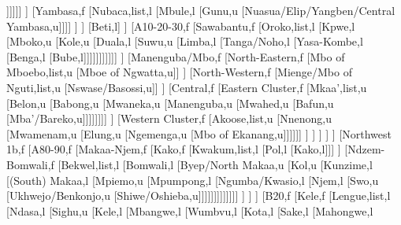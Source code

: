 \documentclass[landscape]{standalone}
\begin{document}
\begin{forest}
														[Tunen,l
														[Tuotomb,l
														[Yambeta,u
														[Nyokon,u]]]]]]
													]%
													[Yambasa,f
														[Nubaca,list,l
														[Mbule,l
														[Gunu,u
														[Nuasua/Elip/Yangben/Central Yambasa,u]]]]														
													]%
												]%
												[Beti,l]
											]%
											[A10-20-30,f
												[Sawabantu,f
													[Oroko,list,l
													[Kpwe,l
													[Mboko,u
													[Kole,u
													[Duala,l
													[Suwu,u
													[Limba,l
													[Tanga/Noho,l
													[Yasa-Kombe,l
													[Benga,l
													[Bube,l]]]]]]]]]]]
												]%
												[Manenguba/Mbo,f
													[North-Eastern,f
														[Mbo of Mboebo,list,u
														[Mboe of Ngwatta,u]]
													]%
													[North-Western,f
														[Mienge/Mbo of Nguti,list,u
														[Nswase/Basossi,u]]
													]%
													[Central,f
														[Eastern Cluster,f
															[Mkaa',list,u
															[Belon,u
															[Babong,u
															[Mwaneka,u
															[Manenguba,u
															[Mwahed,u
															[Bafun,u
															[Mba'/Bareko,u]]]]]]]]
														]%
														[Western Cluster,f
															[Akoose,list,u
															[Nnenong,u
															[Mwamenam,u
															[Elung,u
															[Ngemenga,u
															[Mbo of Ekanang,u]]]]]]
														]%
													]%
												]%
											]%
										]%
										[Northwest 1b,f
											[A80-90,f
												[Makaa-Njem,f
													[Kako,f
														[Kwakum,list,l
														[Pol,l
														[Kako,l]]]
													]%
													[Ndzem-Bomwali,f
														[Bekwel,list,l
														[Bomwali,l
														[Byep/North Makaa,u
														[Kol,u
														[Kunzime,l
														[(South) Makaa,l
														[Mpiemo,u
														[Mpumpong,l
														[Ngumba/Kwasio,l
														[Njem,l
														[Swo,u
														[Ukhwejo/Benkonjo,u
														[Shiwe/Oshieba,u]]]]]]]]]]]]]
													]%
												]%
											]%
											[B20,f
												[Kele,f
													[Lengue,list,l
													[Ndasa,l
													[Sighu,u
													[Kele,l
													[Mbangwe,l
													[Wumbvu,l
													[Kota,l
													[Sake,l
													[Mahongwe,l

\end{forest}
\end{document}
